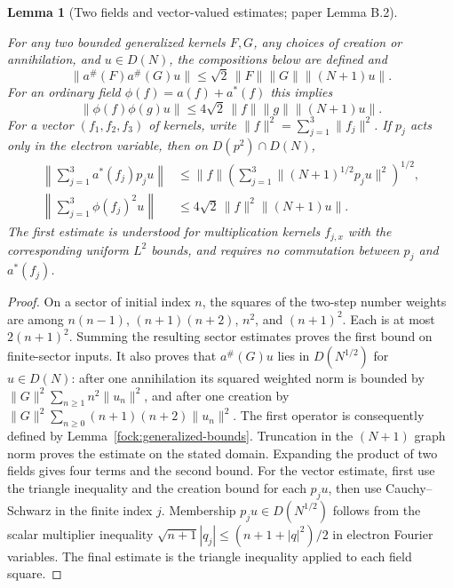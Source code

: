 \documentclass[11pt,a4paper]{article}
\newtheorem{lemma}[theorem]{Lemma}
\theoremstyle{definition}
\theoremstyle{remark}
\newcommand{\proofid}[1]{\par\smallskip{\normalfont\scriptsize\color{inkblue}Stable ID: \nolinkurl{#1}}\par\smallskip}
\begin{document}
\begin{lemma}[Two fields and vector-valued estimates; paper Lemma B.2]
\label{fock:two-fields}
\proofid{fock:two-fields}
\par{}\par\smallskip

For any two bounded generalized kernels $F,G$, any choices of creation or
annihilation, and $u\in D(N)$, the compositions below are defined and
\[
 \|a^{\#}(F)a^{\#}(G)u\|
       \leq\sqrt2\,\|F\|\|G\|\|(N+1)u\|.
\]
For an ordinary field $\phi(f)=a(f)+a^*(f)$ this implies
\[
 \|\phi(f)\phi(g)u\|
       \leq4\sqrt2\,\|f\|\|g\|\|(N+1)u\|.
\]
For a vector $(f_1,f_2,f_3)$ of kernels, write
$\|f\|^2=\sum_{j=1}^3\|f_j\|^2$. If $p_j$ acts only in the electron
variable, then on $D(p^2)\cap D(N)$,
\begin{align*}
 \left\|\sum_{j=1}^3 a^*(f_j)p_ju\right\|
 &\leq\|f\|\left(\sum_{j=1}^3\|(N+1)^{1/2}p_ju\|^2\right)^{1/2},\\
 \left\|\sum_{j=1}^3\phi(f_j)^2u\right\|
 &\leq4\sqrt2\,\|f\|^2\|(N+1)u\|.
\end{align*}
The first estimate is understood for multiplication kernels $f_{j,x}$
with the corresponding uniform $L^2$ bounds, and requires no commutation
between $p_j$ and $a^*(f_j)$.
\end{lemma}
\begin{proof}
On a sector of initial index $n$, the squares of the two-step number
weights are among
$n(n-1)$, $(n+1)(n+2)$, $n^2$, and $(n+1)^2$. Each is at most
$2(n+1)^2$. Summing the resulting sector estimates proves the first
bound on finite-sector inputs. It also proves that $a^{\#}(G)u$ lies
in $D(N^{1/2})$ for $u\in D(N)$: after one annihilation its squared
weighted norm is bounded by
$\|G\|^2\sum_{n\geq1}n^2\|u_n\|^2$, and after one creation by
$\|G\|^2\sum_{n\geq0}(n+1)(n+2)\|u_n\|^2$.
The first operator is consequently
defined by Lemma~\ref{fock:generalized-bounds}. Truncation in the
$(N+1)$ graph norm proves the estimate on the stated domain.
Expanding the product of two fields gives four terms and the second
bound. For the vector estimate, first use the triangle inequality and
the creation bound for each $p_ju$, then use Cauchy--Schwarz in the finite
index $j$. Membership $p_ju\in D(N^{1/2})$ follows from the scalar
multiplier inequality
$\sqrt{n+1}|q_j|\leq(n+1+|q|^2)/2$ in electron Fourier variables.
The final estimate is the triangle inequality applied to each field
square.
\end{proof}
\end{document}
